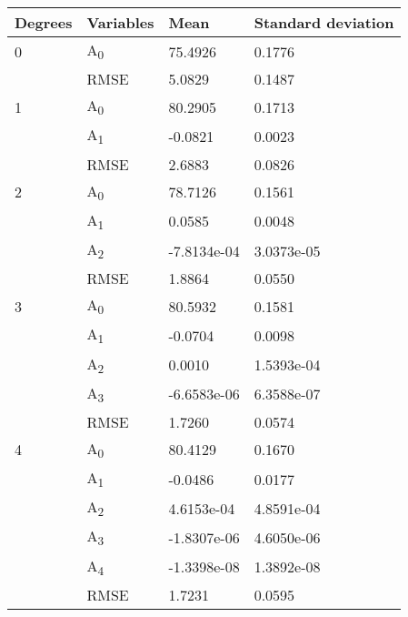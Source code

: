 \documentclass[]{article}
\date{}
\begin{document}
\begin{longtable}[]{@{}llll@{}}
\toprule
Degrees & Variables & Mean & Standard deviation\tabularnewline
\midrule
\endhead
0 & A\textsubscript{0} & 75.4926 & 0.1776\tabularnewline
& RMSE & 5.0829 & 0.1487\tabularnewline
1 & A\textsubscript{0} & 80.2905 & 0.1713\tabularnewline
& A\textsubscript{1} & -0.0821 & 0.0023\tabularnewline
& RMSE & 2.6883 & 0.0826\tabularnewline
2 & A\textsubscript{0} & 78.7126 & 0.1561\tabularnewline
& A\textsubscript{1} & 0.0585 & 0.0048\tabularnewline
& A\textsubscript{2} & -7.8134e-04 & 3.0373e-05\tabularnewline
& RMSE & 1.8864 & 0.0550\tabularnewline
3 & A\textsubscript{0} & 80.5932 & 0.1581\tabularnewline
& A\textsubscript{1} & -0.0704 & 0.0098\tabularnewline
& A\textsubscript{2} & 0.0010 & 1.5393e-04\tabularnewline
& A\textsubscript{3} & -6.6583e-06 & 6.3588e-07\tabularnewline
& RMSE & 1.7260 & 0.0574\tabularnewline
4 & A\textsubscript{0} & 80.4129 & 0.1670\tabularnewline
& A\textsubscript{1} & -0.0486 & 0.0177\tabularnewline
& A\textsubscript{2} & 4.6153e-04 & 4.8591e-04\tabularnewline
& A\textsubscript{3} & -1.8307e-06 & 4.6050e-06\tabularnewline
& A\textsubscript{4} & -1.3398e-08 & 1.3892e-08\tabularnewline
& RMSE & 1.7231 & 0.0595\tabularnewline
\bottomrule
\end{longtable}
\end{document}

